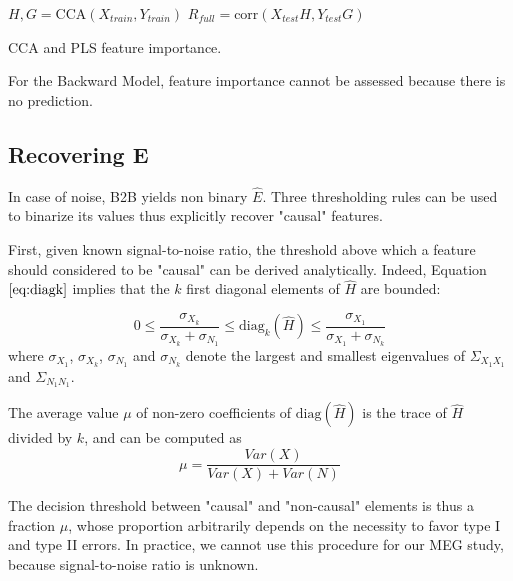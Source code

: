 \begin{algorithm}[H]
      $H, G = \text{CCA}(X_{train},
Y_{train})$\; $R_{full} = \text{corr}(X_{test} H, Y_{test} G)$\;

     
\caption{CCA and PLS feature importance.} \label{algorithm:cdp_fi}
\end{algorithm}

For the Backward Model, feature importance cannot be assessed because there is
no prediction.

\subsection{Recovering E}
\label{recovering}

In case of noise, B2B yields non binary $\hat E$. Three thresholding rules can
be used to binarize its values thus explicitly recover "causal" features.

First, given known signal-to-noise ratio, the threshold above which a feature
should considered to be "causal" can be derived analytically. Indeed, Equation
$\ref{eq:diagk}$ implies that the $k$ first diagonal elements of $\hat H$ are
bounded:  %

$$0 \leq \frac{\sigma_{X_k}}{\sigma_{X_k} +\sigma_{N_1}} \leq
\text{diag}_k(\hat{H})\leq  \frac{\sigma_{X_1}}{\sigma_{X_1} +\sigma_{N_k}}$$
where $\sigma_{X_1}$, $\sigma_{X_k}$, $\sigma_{N_1}$ and $\sigma_{N_k}$ denote
the largest and smallest eigenvalues of $\Sigma_{X_1 X_1}$ and $\Sigma_{N_1
N_1}$.

The average value $\mu$ of non-zero coefficients of $\text{diag}(\hat H)$ is the
trace of $\hat H$ divided by $k$, and can be computed as
\begin{equation}
\mu = \frac{Var(X)}{Var(X)+Var(N)}
\end{equation}

The decision threshold between "causal" and "non-causal" elements is thus a fraction
$\mu$, whose proportion arbitrarily depends on the necessity to favor type I and
type II errors. In practice, we cannot use this procedure for our MEG study,
because signal-to-noise ratio is unknown.

